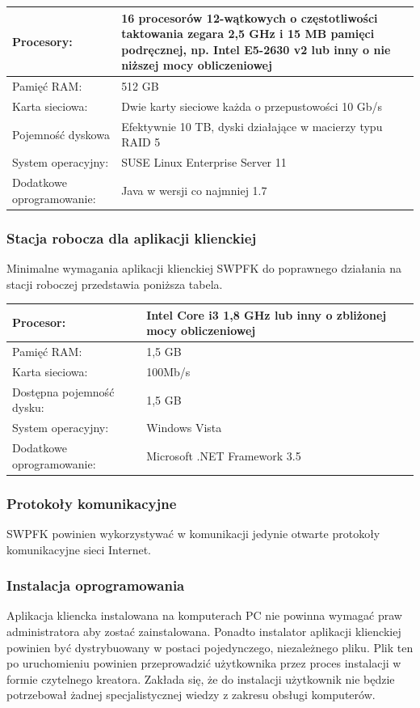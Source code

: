 \begin{center}
\begin{tabular}[h]{|p{3.5cm}|p{11.6cm}|}
\hline
Procesory: & 16 procesorów 12-wątkowych o częstotliwości taktowania zegara 2,5 GHz i 15 MB pamięci podręcznej, np. Intel E5-2630 v2 lub inny o nie niższej mocy obliczeniowej\\ \hline
Pamięć RAM: & 512 GB \\ \hline
Karta sieciowa: & Dwie karty sieciowe każda o przepustowości 10 Gb/s \\ \hline
Pojemność dyskowa & Efektywnie 10 TB, dyski działające w macierzy typu RAID 5 \\ \hline
System operacyjny: & SUSE Linux Enterprise Server 11 \\ \hline
Dodatkowe oprogramowanie: & Java w wersji co najmniej 1.7 \\
\hline
\end{tabular}
\end{center}

\subsubsection*{Stacja robocza dla aplikacji klienckiej}
Minimalne wymagania aplikacji klienckiej SWPFK do poprawnego działania na stacji roboczej przedstawia poniższa tabela.

\begin{center}
\begin{tabular}[h]{|p{3.5cm}|p{11.6cm}|}
\hline
Procesor: & Intel Core i3 1,8 GHz lub inny o zbliżonej mocy obliczeniowej \\ \hline
Pamięć RAM: & 1,5 GB \\ \hline
Karta sieciowa: & 100Mb/s \\ \hline
Dostępna pojemność dysku: & 1,5 GB \\ \hline
System operacyjny: & Windows Vista \\ \hline
Dodatkowe oprogramowanie: & Microsoft .NET Framework 3.5 \\
\hline
\end{tabular}
\end{center}

\subsubsection{Protokoły komunikacyjne}
SWPFK powinien wykorzystywać w komunikacji jedynie otwarte protokoły komunikacyjne sieci Internet.

\subsubsection{Instalacja oprogramowania}
Aplikacja kliencka instalowana na komputerach PC nie powinna wymagać praw administratora aby zostać zainstalowana. Ponadto instalator aplikacji klienckiej powinien być dystrybuowany w postaci pojedynczego, niezależnego pliku. Plik ten po uruchomieniu powinien przeprowadzić użytkownika przez proces instalacji w formie czytelnego kreatora. Zakłada się, że do instalacji użytkownik nie będzie potrzebował żadnej specjalistycznej wiedzy z zakresu obsługi komputerów.


